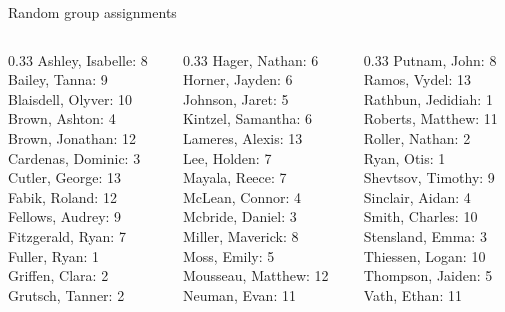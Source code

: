 \documentclass[10pt]{beamer}
\begin{document}
\begin{frame}{Random group assignments}
\begin{columns}
\begin{column}{0.33\textwidth}
Ashley, Isabelle: 8 \\ 
Bailey, Tanna: 9 \\ 
Blaisdell, Olyver: 10 \\ 
Brown, Ashton: 4 \\ 
Brown, Jonathan: 12 \\ 
Cardenas, Dominic: 3 \\ 
Cutler, George: 13 \\ 
Fabik, Roland: 12 \\ 
Fellows, Audrey: 9 \\ 
Fitzgerald, Ryan: 7 \\ 
Fuller, Ryan: 1 \\ 
Griffen, Clara: 2 \\ 
Grutsch, Tanner: 2 \\\end{column}
\begin{column}{0.33\textwidth}
Hager, Nathan: 6 \\ 
Horner, Jayden: 6 \\ 
Johnson, Jaret: 5 \\ 
Kintzel, Samantha: 6 \\ 
Lameres, Alexis: 13 \\ 
Lee, Holden: 7 \\ 
Mayala, Reece: 7 \\ 
McLean, Connor: 4 \\ 
Mcbride, Daniel: 3 \\ 
Miller, Maverick: 8 \\ 
Moss, Emily: 5 \\ 
Mousseau, Matthew: 12 \\ 
Neuman, Evan: 11 \\\end{column}
\begin{column}{0.33\textwidth}
Putnam, John: 8 \\ 
Ramos, Vydel: 13 \\ 
Rathbun, Jedidiah: 1 \\ 
Roberts, Matthew: 11 \\ 
Roller, Nathan: 2 \\ 
Ryan, Otis: 1 \\ 
Shevtsov, Timothy: 9 \\ 
Sinclair, Aidan: 4 \\ 
Smith, Charles: 10 \\ 
Stensland, Emma: 3 \\ 
Thiessen, Logan: 10 \\ 
Thompson, Jaiden: 5 \\ 
Vath, Ethan: 11 \\\end{column}
\end{columns}
\end{frame}
\end{document}

